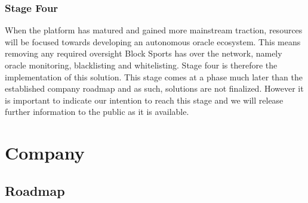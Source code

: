 \documentclass{article}
\begin{document}
		\subsubsection{Stage Four} \label{stage-four}
		When the platform has matured and gained more mainstream traction, resources will be focused towards developing an autonomous oracle ecosystem. This means removing any required oversight Block Sports has over the network, namely oracle monitoring, blacklisting and whitelisting. Stage four is therefore the implementation of this solution. This stage comes at a phase much later than the established company roadmap and as such, solutions are not finalized. However it is important to indicate our intention to reach this stage and we will release further information to the public as it is available.

\section{Company} \label{company}
	\subsection{Roadmap} \label{roadmap}
\end{document}
